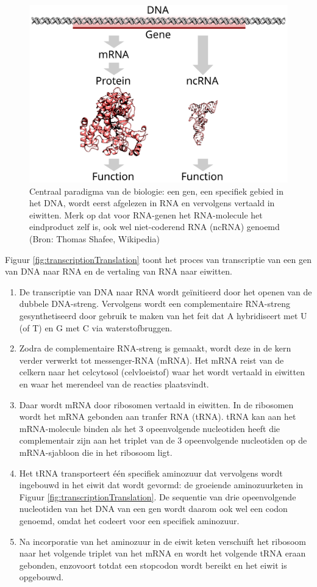 \documentclass[
  11pt,
]{book}
\begin{document}
\begin{figure}

{\centering \includegraphics[width=0.5\linewidth]{./figs/gene} 

}

\caption{Centraal paradigma van de biologie: een gen, een specifiek gebied in het DNA, wordt eerst afgelezen in RNA en vervolgens vertaald in eiwitten. Merk op dat voor RNA-genen het RNA-molecule het eindproduct zelf is, ook wel niet-coderend RNA (ncRNA) genoemd (Bron:  Thomas Shafee, Wikipedia)}\label{fig:centralParadigm}
\end{figure}

Figuur \ref{fig:transcriptionTranslation} toont het proces van transcriptie van een gen van DNA naar RNA en de vertaling van RNA naar eiwitten.

\begin{enumerate}
\def\labelenumi{\arabic{enumi}.}
\item
  De transcriptie van DNA naar RNA wordt geïnitieerd door het openen van de dubbele DNA-streng. Vervolgens wordt een complementaire RNA-streng gesynthetiseerd door gebruik te maken van het feit dat A hybridiseert met U (of T) en G met C via waterstofbruggen.
\item
  Zodra de complementaire RNA-streng is gemaakt, wordt deze in de kern verder verwerkt tot messenger-RNA (mRNA). Het mRNA reist van de celkern naar het celcytosol (celvloeistof) waar het wordt vertaald in eiwitten en waar het merendeel van de reacties plaatsvindt.
\item
  Daar wordt mRNA door ribosomen vertaald in eiwitten. In de ribosomen wordt het mRNA gebonden aan tranfer RNA (tRNA). tRNA kan aan het mRNA-molecule binden als het 3 opeenvolgende nucleotiden heeft die complementair zijn aan het triplet van de 3 opeenvolgende nucleotiden op de mRNA-sjabloon die in het ribosoom ligt.
\item
  Het tRNA transporteert één specifiek aminozuur dat vervolgens wordt ingebouwd in het eiwit dat wordt gevormd: de groeiende aminozuurketen in Figuur \ref{fig:transcriptionTranslation}. De sequentie van drie opeenvolgende nucleotiden van het DNA van een gen wordt daarom ook wel een codon genoemd, omdat het codeert voor een specifiek aminozuur.
\item
  Na incorporatie van het aminozuur in de eiwit keten verschuift het ribosoom naar het volgende triplet van het mRNA en wordt het volgende tRNA eraan gebonden, enzovoort totdat een stopcodon wordt bereikt en het eiwit is opgebouwd.
\end{enumerate}
\end{document}
